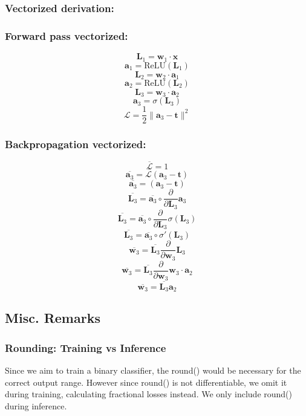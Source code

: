 \documentclass{article}
\begin{document}
\subsubsection{Vectorized derivation:}
\subsubsection{Forward pass vectorized:}
\[\bm{L}_1 = \bm{w}_1 \cdot \bm{x} \]
\[\bm{a}_1 = \text{ReLU}(\bm{L}_1) \]
\[\bm{L}_2 = \bm{w}_2 \cdot \bm{a}_1\]
\[\bm{a}_2 = \text{ReLU}(\bm{L}_2)\]
\[\bm{L}_3 = \bm{w}_3 \cdot \bm{a}_2\]
\[\bm{a}_3 = \sigma(\bm{L}_3)\]
\[\mathcal{L} = \frac{1}{2}\|\bm{a}_3-\bm{t}\|^2\]
\subsubsection{Backpropagation vectorized:}
\[\overline{\mathcal{L}} = 1\]
\[\overline{\bm{a}_3} = \overline{\mathcal{L}} (\bm{a}_3 - \bm{t})\]
\[\overline{\bm{a}_3} = (\bm{a}_3 - \bm{t})\]
\[\overline{\bm{L}_3} = \overline{\bm{a}_3} \circ \frac{\partial}{\partial{\bm{L}_3}} \bm{a}_3\]
\[\overline{\bm{L}_3} = \overline{\bm{a}_3} \circ \frac{\partial}{\partial{\bm{L}_3}} \sigma(\bm{L}_3)\]
\[\overline{\bm{L}_3} = \overline{\bm{a}_3} \circ \sigma ' (\bm{L}_3)\]
\[\overline{\bm{w}_3} = \overline{\bm{L}_3} \frac{\partial}{\partial{\bm{w}_3}} \bm{L}_3\]
\[\overline{\bm{w}_3} = \overline{\bm{L}_3} \frac{\partial}{\partial{\bm{w}_3}} \bm{w}_3 \cdot \bm{a}_2\]
\[\overline{\bm{w}_3} = \overline{\bm{L}_3} \bm{a}_2\]


\subsection{Misc. Remarks}
\subsubsection{Rounding: Training vs Inference} Since we aim to train a binary classifier, the round() would be necessary for the correct output range. However since round() is not differentiable, we omit it during training, calculating fractional losses instead. We only include round() during inference.
\end{document}
